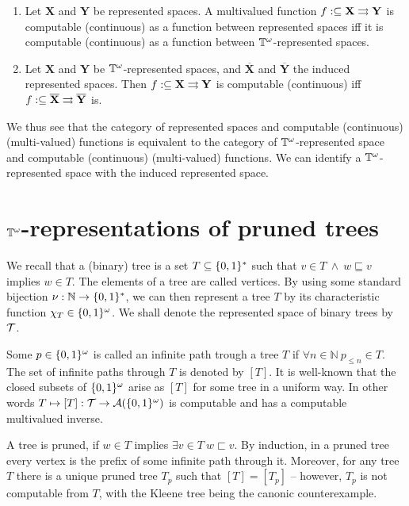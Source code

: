 \documentclass{eptcs-modified}
\begin{document}
\begin{proposition}
\begin{enumerate}
\item Let $\mathbf{X}$ and $\mathbf{Y}$ be represented spaces. A multivalued function $f : \subseteq \mathbf{X} \rightrightarrows \mathbf{Y}$ is computable (continuous) as a function between represented spaces iff it is computable (continuous) as a function between $\mathbb{T}^\omega$-represented spaces.
\item Let $\mathbf{X}$ and $\mathbf{Y}$ be $\mathbb{T}^\omega$-represented spaces, and $\overline{\mathbf{X}}$ and $\overline{\mathbf{Y}}$ the induced represented spaces. Then $f : \subseteq \mathbf{X} \rightrightarrows \mathbf{Y}$ is computable (continuous) iff $f : \subseteq \overline{\mathbf{X}} \rightrightarrows \overline{\mathbf{Y}}$ is.
\end{enumerate}
\end{proposition}

 We thus see that the category of represented spaces and  computable (continuous) (multi-valued) functions is equivalent to the category of $\mathbb{T}^\omega$-represented space and computable (continuous) (multi-valued) functions. We can identify a $\mathbb{T}^\omega$-represented space with  the induced represented space.




\section{$\mathbb{T}^\omega$-representations of pruned trees}
\label{sec:cantor}
We recall that a (binary) tree is a set $T \subseteq \{0,1\}^*$ such that $v \in T \ \wedge \ w \sqsubseteq v$ implies $w \in T$. The elements of a tree are called vertices. By using some standard bijection $\nu : \mathbb{N} \to \{0,1\}^*$, we can then represent a tree $T$ by its characteristic function $\chi_T \in {\{0,1\}^\omega}$. We shall denote the represented space of binary trees by $\mathcal{T}$.

Some $p \in {\{0,1\}^\omega}$ is called an infinite path trough a tree $T$ if $\forall n \in \mathbb{N} \ p_{\leq n} \in T$. The set of infinite paths through $T$ is denoted by $[T]$. It is well-known that the closed subsets of ${\{0,1\}^\omega}$ arise as $[T]$ for some tree in a uniform way. In other words $T \mapsto [T] : \mathcal{T} \to \mathcal{A}({\{0,1\}^\omega})$ is computable and has a computable multivalued inverse.

A tree is pruned, if $w \in T$ implies $\exists v \in T \ w \sqsubset v$. By induction, in a pruned tree every vertex is the prefix of some infinite path through it. Moreover, for any tree $T$ there is a unique pruned tree $T_{p}$ such that $[T] = [T_p]$ -- however, $T_p$ is not computable from $T$, with the Kleene tree being the canonic counterexample.
\end{document}
